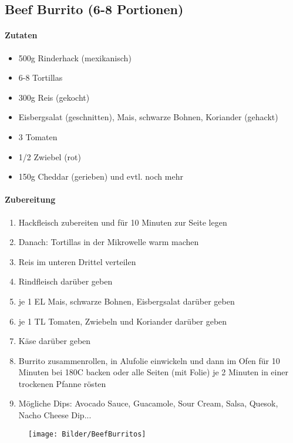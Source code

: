 \newpage
\subsection{Beef Burrito (6-8 Portionen)}
\paragraph{Zutaten}
\begin{itemize}[noitemsep]
	\item 500g Rinderhack (mexikanisch)
	\item 6-8 Tortillas
	\item 300g Reis (gekocht)
	\item Eisbergsalat (geschnitten), Mais, schwarze Bohnen, Koriander (gehackt)
	\item 3 Tomaten
	\item 1/2 Zwiebel (rot)
	\item 150g Cheddar (gerieben) und evtl. noch mehr
\end{itemize}
\paragraph{Zubereitung}
\begin{enumerate}[noitemsep]
	\item Hackfleisch zubereiten und für 10 Minuten zur Seite legen
	\item Danach: Tortillas in der Mikrowelle warm machen
	\item Reis im unteren Drittel verteilen
	\item Rindfleisch darüber geben 
	\item je 1 EL Mais, schwarze Bohnen, Eisbergsalat darüber geben 
	\item je 1 TL Tomaten, Zwiebeln und Koriander darüber geben
	\item Käse darüber geben
	\item Burrito zusammenrollen, in Alufolie einwickeln und dann im Ofen für 10 Minuten bei 180\textdegree C backen oder alle Seiten (mit Folie) je 2 Minuten in einer trockenen Pfanne rösten
	\item Mögliche Dips: Avocado Sauce, Guacamole, Sour Cream, Salsa, Quesok, Nacho Cheese Dip...
\end{enumerate}
\begin{figure}[h]
\centering
\texttt{[image: Bilder/BeefBurritos]}
\end{figure}